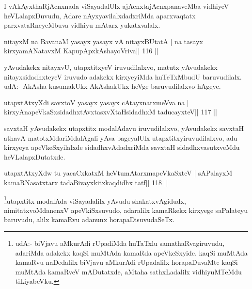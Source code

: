 \begin{artha}
I vAkAyxthaRjAcnxnada viSayadalUlx ajAcnxtajAcnxpanaveMba vidhiyeV heVLalapxDuvudu, Adare nAyxyavilalxdadxriMda aparxvaqtatx parxvataRneyeMbuva vidhiyu mAtarx yukatxvalalx.
\end{artha}


\begin{shl}
nitayxM na BavanaM yasayx yasayx vA nitayxBUtatA |
na tasayx kirxyamANatavxM KapupApxkAshayoVriva\hfill || 116 ||
\end{shl}

\begin{artha}
yAvudakekx nitayxvU, utapxtitxyeV iruvudilalxvo, matutx yAvudakekx nitayxsidadhxteyeV iruvudo adakekx kirxyeyiMda huTeTxMbudU baruvudilalx. udA:- AkAsha kusumakUkx AkAshakUkx heVge baruvudilalxvo hAgeye.
\end{artha}


\begin{shl}
utapxtAtxyXdi savxtoV yasayx yasayx cAtayxnatxmeVva na |
kirxyAnapeVkaSxsidadhxtAvxtasxvXtaHsidadhxM taducayxteV\hfill || 117 ||
\end{shl}

\begin{artha}
savxtaH yAvudakekx utapxtitx modalAdavu iruvudilalxvo, yAvudakekx savxtaH athavA matotxMdariMdalAgali yAva bageyalUlx utapxtitxyiruvudilalxvo, adu kirxyeya apeVkeSxyilalxde sidadhxvAdadxriMda savxtaH sidadhxvasutxveMdu heVLalapxDutatxde. 
\end{artha}

\begin{shl}
utapxtAtxyXdw tu yacaCxkatxM heVtumAtarxmapeVkaSxteV |
sAPalayxM kamaRNasatxtarx tadaBivayxkitxkaqdidhx tatf\hfill || 118 ||
\end{shl}

\begin{artha}
\footnote{udA:- biVjavu aMkurAdi rUpadiMda huTaTxlu samathaRvagiruvudu, adariMda adakekx kaqSi muMtAda kamaRda apeVkeSxyide. kaqSi muMtAda kamaRvu naDedalilx biVjavu aMkurAdi rUpadalilx horapaDuvaMte kaqSi muMtAda kamaRveV mADutatxde, aMtaha sathxLadalilx vidhiyuMTeMdu tiLiyabeVku.}utapxtitx modalAda viSayadalilx yAvudu shakatxvAgidudx, nimitatxvoMdanenxV apeVkiSxsuvudo, adaralilx kamaRkekx kirxyege saPalateyu baruvudu, alilx kamaRvu adanunx horapaDisuvudaSeTx.
\end{artha}

